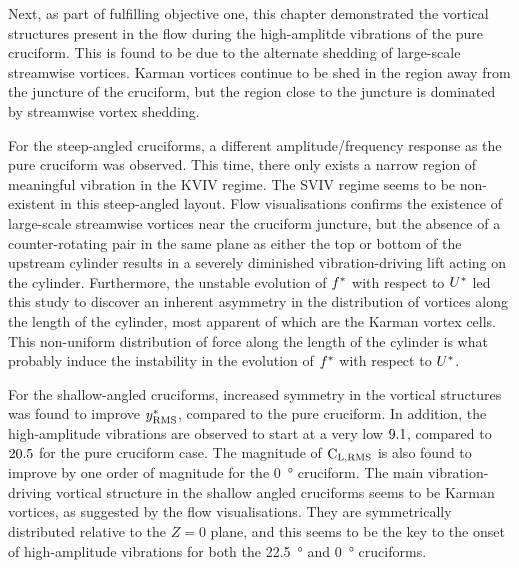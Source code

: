 \documentclass[oneside]{utmthesis}
\begin{document}

Next, as part of fulfilling objective one, this chapter demonstrated the vortical structures present in the flow during the high-amplitde vibrations of the pure cruciform. This is found to be due to the alternate shedding of large-scale streamwise vortices. Karman vortices continue to be shed in the region away from the juncture of the cruciform, but the region close to the juncture is dominated by streamwise vortex shedding.

For the steep-angled cruciforms, a different amplitude/frequency response as the pure cruciform was observed. This time, there only exists a narrow region of meaningful vibration in the KVIV regime. The SVIV regime seems to be non-existent in this steep-angled layout. Flow visualisations confirms the existence of large-scale streamwise vortices near the cruciform juncture, but the absence of a counter-rotating pair in the same plane as either the top or bottom of the upstream cylinder results in a severely diminished vibration-driving lift acting on the cylinder. Furthermore, the unstable evolution of $f^{*}$ with respect to $U^{*}$ led this study to discover an inherent asymmetry in the distribution of vortices along the length of the cylinder, most apparent of which are the Karman vortex cells. This non-uniform distribution of force along the length of the cylinder is what probably induce the instability in the evolution of $f^{*}$ with respect to $U^{*}$.

For the shallow-angled cruciforms, increased symmetry in the vortical structures was found to improve $y^{*}_{\text{RMS}}$, compared to the pure cruciform. In addition, the high-amplitude vibrations are observed to start at a very low $9.1$, compared to $20.5$ for the pure cruciform case. The magnitude of $\text{C}_{\text{L,RMS}}$ is also found to improve by one order of magnitude for the \SI{0}{\degree} cruciform. The main vibration-driving vortical structure in the shallow angled cruciforms seems to be Karman vortices, as suggested by the flow visualisations. They are symmetrically distributed relative to the $Z=0$ plane, and this seems to be the key to the onset of high-amplitude vibrations for both the \SI{22.5}{\degree} and \SI{0}{\degree} cruciforms.

\end{document}
